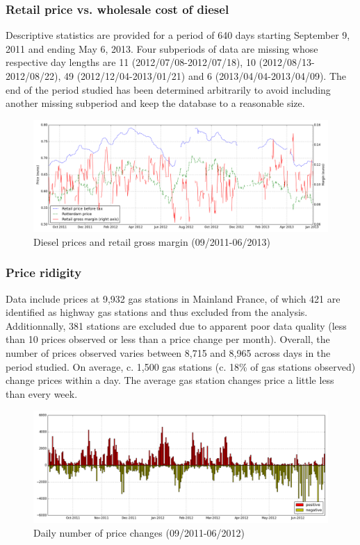\documentclass[11pt]{article}
\begin{document}
\subsubsection{Retail price vs. wholesale cost of diesel}

Descriptive statistics are provided for a period of 640 days starting September 9, 2011 and ending May 6, 2013. Four subperiods of data are missing whose respective day lengths are 11 (2012/07/08-2012/07/18), 10 (2012/08/13-2012/08/22), 49 (2012/12/04-2013/01/21) and 6 (2013/04/04-2013/04/09). The end of the period studied has been determined arbitrarily to avoid including another missing subperiod and keep the database to a reasonable size.

\begin{figure}[!h]
    \caption{Diesel prices and retail gross margin (09/2011-06/2013)}
	\centering
		\includegraphics[width=16cm]{graphs/diesel_price_margin.png}
\end{figure}

\subsubsection{Price ridigity}

Data include prices at 9,932 gas stations in Mainland France, of which 421 are identified as highway gas stations and thus excluded from the analysis. Additionnally, 381 stations are excluded due to apparent poor data quality (less than 10 prices observed or less than a price change per month). Overall, the number of prices observed varies between 8,715 and 8,965 across days in the period studied. On average, c. 1,500 gas stations (c. 18\% of gas stations observed) change prices within a day. The average gas station changes price a little less than every week.

\begin{figure}[!h]
    \caption{Daily number of price changes (09/2011-06/2012)}
	\centering
		\includegraphics[width=16cm]{graphs/diesel_nb_price_chges.png}
\end{figure}
\end{document}
